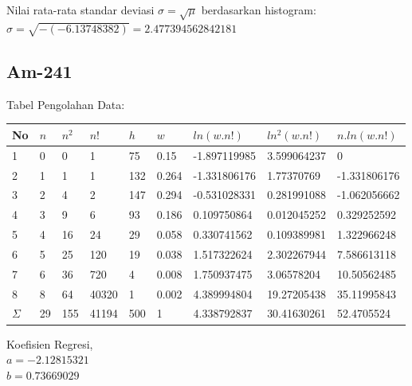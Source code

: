 \documentclass{article}
\begin{document}
			Nilai rata-rata standar deviasi $\sigma = \sqrt{\mu}$ berdasarkan histogram:\\
			$ \sigma = \sqrt{-(-6.13748382)} = 2.477394562842181 $\newpage
			
			\subsection{Am-241}
			Tabel Pengolahan Data:
			\begin{longtable}{@{}lllllllll@{}}
				\toprule
				No  & $n$  & $n^{2}$ & $n!$   & $h$   & $w$     & $ln(w.n!)$     & $ln^{2}(w.n!)$ & $n.ln(w.n!)$   \\ \midrule
				\endfirsthead
				\endhead
				\bottomrule
				\endfoot
				\endlastfoot
				1   & 0  & 0                    & 1     & 75  & 0.15  & -1.897119985 & 3.599064237                 & 0            \\
				2   & 1  & 1                    & 1     & 132 & 0.264 & -1.331806176 & 1.77370769                  & -1.331806176 \\
				3   & 2  & 4                    & 2     & 147 & 0.294 & -0.531028331 & 0.281991088                 & -1.062056662 \\
				4   & 3  & 9                    & 6     & 93  & 0.186 & 0.109750864  & 0.012045252                 & 0.329252592  \\
				5   & 4  & 16                   & 24    & 29  & 0.058 & 0.330741562  & 0.109389981                 & 1.322966248  \\
				6   & 5  & 25                   & 120   & 19  & 0.038 & 1.517322624  & 2.302267944                 & 7.586613118  \\
				7   & 6  & 36                   & 720   & 4   & 0.008 & 1.750937475  & 3.06578204                  & 10.50562485  \\
				8   & 8  & 64                   & 40320 & 1   & 0.002 & 4.389994804  & 19.27205438                 & 35.11995843  \\* \midrule
				$\Sigma$ & 29 & 155                  & 41194 & 500 & 1     & 4.338792837  & 30.41630261                 & 52.4705524   \\* \bottomrule
			\end{longtable}
			\hspace{-0.6cm}Koefisien Regresi, \\
			$a = -2.12815321$ \\
			$b = 0.73669029$ \\ \\
\end{document}
